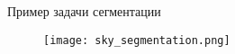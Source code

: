
\begin{frame}{Пример задачи сегментации}
\begin{figure}
\centering
\texttt{[image: sky\_segmentation.png]}
\end{figure}
\end{frame}